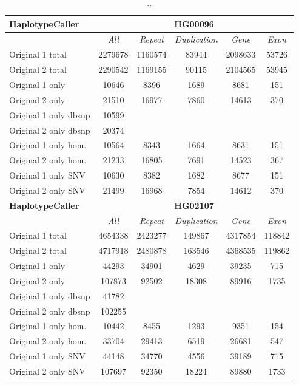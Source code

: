\begin{table}[htb]
\begin{center}
\begin{tabular}{|l|c||c|c|c|c|}
\hline
{\bf HaplotypeCaller} & \multicolumn{5}{|c|}{\bf HG00096} \\
\hline
\cline{2-6}
{\bf} & {\it All} & {\it Repeat} & {\it Duplication} & {\it Gene} & {\it Exon} \\
\hline
Original 1 total & 2279678 & 1160574 & 83944 & 2098633 & 53726\\
\hline
Original 2 total & 2290542 & 1169155 & 90115 & 2104565 & 53945\\
\hline
Original 1 only & 10646 & 8396 & 1689 & 8681 & 151\\
\hline 
Original 2 only & 21510 & 16977 & 7860 & 14613 & 370\\
\hline 
Original 1 only dbsnp & 10599 &  &  &  & \\
\hline 
Original 2 only dbsnp & 20374 &  &  &  & \\
\hline 
Original 1 only hom. & 10564 & 8343 & 1664 & 8631 & 151\\
\hline 
Original 2 only hom. & 21233 & 16805 & 7691 & 14523 & 367\\
\hline 
Original 1 only SNV & 10630 & 8382 & 1682 & 8677 & 151\\
\hline 
Original 2 only SNV & 21499 & 16968 & 7854 & 14612 & 370\\
\hline
\hline
{\bf HaplotypeCaller} & \multicolumn{5}{|c|}{\bf HG02107} \\
\hline
\cline{2-6}
{\bf} & {\it All} & {\it Repeat} & {\it Duplication} & {\it Gene} & {\it Exon} \\
\hline
Original 1 total & 4654338 & 2423277 & 149867 & 4317854 & 118842\\ 
\hline
Original 2 total & 4717918 & 2480878 & 163546 & 4368535 & 119862\\ 
\hline
Original 1 only & 44293 & 34901 & 4629 & 39235 & 715\\
\hline 
Original 2 only & 107873 & 92502 & 18308 & 89916 & 1735\\
\hline 
Original 1 only dbsnp & 41782 &  &  &  & \\
\hline 
Original 2 only dbsnp & 102255 &  &  &  & \\
\hline 
Original 1 only hom. & 10442 & 8455 & 1293 & 9351 & 154\\
\hline 
Original 2 only hom. & 33704 & 29413 & 6519 & 26681 & 547\\
\hline 
Original 1 only SNV & 44148 & 34770 & 4556 & 39189 & 715\\
\hline 
Original 2 only SNV & 107697 & 92350 & 18224 & 89880 & 1733\\
\hline 
\end{tabular}
\end{center}
\caption{ .. }
\label{tab:orig-vs-orig2-hc}
\end{table}

